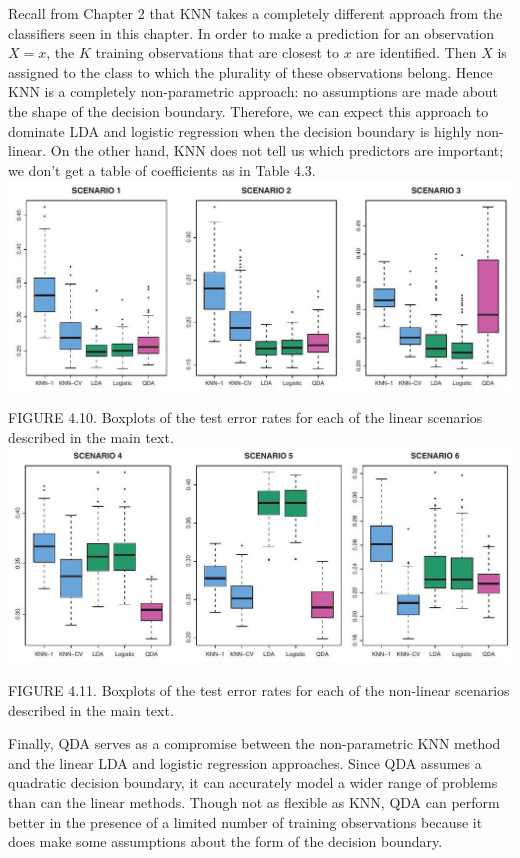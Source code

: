\documentclass[10pt]{article}
\begin{document}
Recall from Chapter 2 that KNN takes a completely different approach from the classifiers seen in this chapter. In order to make a prediction for an observation $X=x$, the $K$ training observations that are closest to $x$ are identified. Then $X$ is assigned to the class to which the plurality of these observations belong. Hence KNN is a completely non-parametric approach: no assumptions are made about the shape of the decision boundary. Therefore, we can expect this approach to dominate LDA and logistic regression when the decision boundary is highly non-linear. On the other hand, KNN does not tell us which predictors are important; we don't get a table of coefficients as in Table 4.3.\\
\includegraphics[max width=\textwidth, center]{2025_05_05_efe77898333945044de4g-167(1)}

FIGURE 4.10. Boxplots of the test error rates for each of the linear scenarios described in the main text.\\
\includegraphics[max width=\textwidth, center]{2025_05_05_efe77898333945044de4g-167}

FIGURE 4.11. Boxplots of the test error rates for each of the non-linear scenarios described in the main text.

Finally, QDA serves as a compromise between the non-parametric KNN method and the linear LDA and logistic regression approaches. Since QDA assumes a quadratic decision boundary, it can accurately model a wider range of problems than can the linear methods. Though not as flexible as KNN, QDA can perform better in the presence of a limited number of training observations because it does make some assumptions about the form of the decision boundary.
\end{document}
